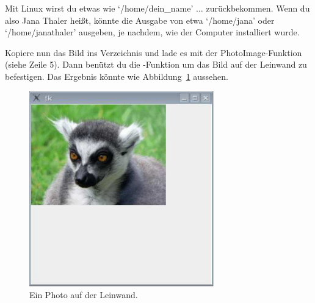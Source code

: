 \begin{LINUX}
Mit Linux wirst du etwas wie `/home/dein\_name' \texorpdfstring{$\ldots$}{...} zurückbekommen. Wenn du also Jana Thaler heißt, könnte die Ausgabe von  etwa `/home/jana' oder `/home/janathaler' ausgeben, je nachdem, wie der Computer installiert wurde.
\end{LINUX}

Kopiere nun das Bild ins Verzeichnis und lade es mit der PhotoImage-Funktion (siehe Zeile 5). Dann benützt du die -Funktion um das Bild auf der Leinwand zu befestigen. Das Ergebnis könnte wie Abbildung~\ref{fig43} aussehen.

\begin{figure}
\begin{center}
\includegraphics[width=80mm]{images/figure43}
\end{center}
\caption{Ein Photo auf der Leinwand.}\label{fig43}
\end{figure}

